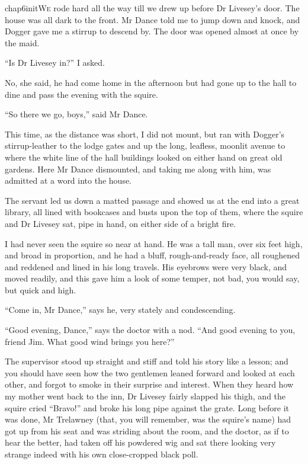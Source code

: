

   \lettrine[lines=4,image=true]{chap6initW}{e} rode hard all the way till we drew up before Dr Livesey’s door. The house was all dark to the front. Mr Dance told me to jump down and knock, and Dogger gave me a stirrup to descend by. The door was opened almost at once by the maid.

\enquote{Is Dr Livesey in?} I asked.

No, she said, he had come home in the afternoon but had gone up to the hall to dine and pass the evening with the squire.

\enquote{So there we go, boys,} said Mr Dance.

This time, as the distance was short, I did not mount, but ran with Dogger’s stirrup-leather to the lodge gates and up the long, leafless, moonlit avenue to where the white line of the hall buildings looked on either hand on great old gardens. Here Mr Dance dismounted, and taking me along with him, was admitted at a word into the house.

The servant led us down a matted passage and showed us at the end into a great library, all lined with bookcases and busts upon the top of them, where the squire and Dr Livesey sat, pipe in hand, on either side of a bright fire.

I had never seen the squire so near at hand. He was a tall man, over six feet high, and broad in proportion, and he had a bluff, rough-and-ready face, all roughened and reddened and lined in his long travels. His eyebrows were very black, and moved readily, and this gave him a look of some temper, not bad, you would say, but quick and high.

\enquote{Come in, Mr Dance,} says he, very stately and condescending.

\enquote{Good evening, Dance,} says the doctor with a nod. \enquote{And good evening to you, friend Jim. What good wind brings you here?}

The supervisor stood up straight and stiff and told his story like a lesson; and you should have seen how the two gentlemen leaned forward and looked at each other, and forgot to smoke in their surprise and interest. When they heard how my mother went back to the inn, Dr Livesey fairly slapped his thigh, and the squire cried \enquote{Bravo!} and broke his long pipe against the grate. Long before it was done, Mr Trelawney (that, you will remember, was the squire’s name) had got up from his seat and was striding about the room, and the doctor, as if to hear the better, had taken off his powdered wig and sat there looking very strange indeed with his own close-cropped black poll.

